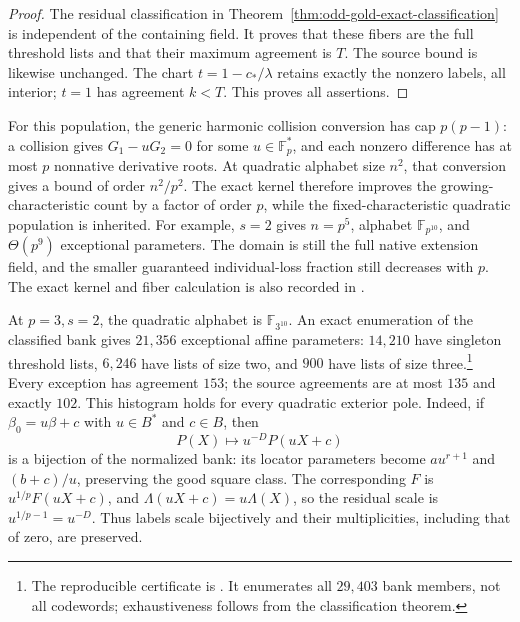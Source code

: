 \begin{proof}
The residual classification in
Theorem~\ref{thm:odd-gold-exact-classification} is independent
of the containing field. It proves that these fibers are the full
threshold lists and that their maximum agreement is $T$.
The source bound is likewise unchanged. The chart
$t=1-c_*/\lambda$ retains exactly the nonzero labels, all interior;
$t=1$ has agreement $k<T$. This proves all assertions.
\end{proof}

For this population, the generic harmonic collision conversion has
cap $p(p-1)$: a collision gives $G_1-uG_2=0$ for some
$u\in\mathbb F_p^*$, and each nonzero difference has at most $p$
nonnative derivative roots. At quadratic alphabet size $n^2$,
that conversion gives a bound of order $n^2/p^2$.
The exact kernel therefore improves the growing-characteristic
count by a factor of order $p$, while the fixed-characteristic
quadratic population is inherited. For example, $s=2$ gives
$n=p^5$, alphabet $\mathbb F_{p^{10}}$, and
$\Theta(p^9)$ exceptional parameters. The domain is still the
full native extension field, and the smaller guaranteed
individual-loss fraction still decreases with $p$.
The exact kernel and fiber calculation is also recorded in
.

At $p=3,s=2$, the quadratic alphabet is $\mathbb F_{3^{10}}$.
An exact enumeration of the classified bank gives $21{,}356$
exceptional affine parameters: $14{,}210$ have singleton threshold
lists, $6{,}246$ have lists of size two, and $900$ have lists of
size three.\footnote{The reproducible certificate is
.
It enumerates all $29{,}403$ bank members, not all codewords;
exhaustiveness follows from the classification theorem.}
Every exception has agreement $153$; the source agreements are at
most $135$ and exactly $102$. This histogram holds for every
quadratic exterior pole. Indeed, if $\beta_0=u\beta+c$ with
$u\in B^*$ and $c\in B$, then
\[
 P(X)\longmapsto u^{-D}P(uX+c)
\]
is a bijection of the normalized bank: its locator parameters become
$a u^{r+1}$ and $(b+c)/u$, preserving the good square class.
The corresponding $F$ is $u^{1/p}F(uX+c)$, and
$\Lambda(uX+c)=u\Lambda(X)$, so the residual scale is
$u^{1/p-1}=u^{-D}$. Thus labels scale bijectively and their
multiplicities, including that of zero, are preserved.
